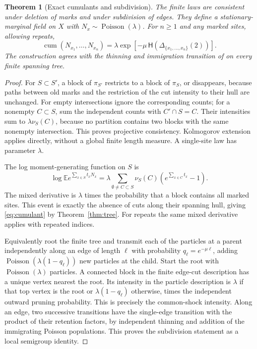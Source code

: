 \documentclass[11pt]{article}
\newtheorem{theorem}{Theorem}[section]
\theoremstyle{remark}
\newcommand{\E}{\mathbb E}
\newcommand{\cum}{\operatorname{cum}}
\newcommand{\D}{\Delta}
\newcommand{\hprice}{\mathsf H}
\begin{document}
\begin{theorem}[Exact cumulants and subdivision]\label{thm:poisson}
The finite laws are consistent under deletion of marks and under subdivision of edges. They define a stationary-marginal field on \(X\) with \(N_x\sim\operatorname{Poisson}(\lambda)\). For \(n\ge1\) and any marked sites, allowing repeats,
\begin{equation}\label{eq:cumulant}
 \cum(N_{x_1},\ldots,N_{x_n})
  =\lambda \exp\!\left[-\mu\,\hprice\!\left(\D_{\{x_1,\ldots,x_n\}}(2)\right)\right].
\end{equation}
The construction agrees with the thinning and immigration transition of \cite{Cote} on every finite spanning tree.
\end{theorem}
\begin{proof}
For \(S\subset S'\), a block of \(\pi_{S'}\) restricts to a block of \(\pi_S\), or disappears, because paths between old marks and the restriction of the cut intensity to their hull are unchanged. For empty intersections ignore the corresponding counts; for a nonempty \(C\subset S\), sum the independent counts with \(C'\cap S=C\). Their intensities sum to \(\lambda\nu_S(C)\), because no partition contains two blocks with the same nonempty intersection. This proves projective consistency. Kolmogorov extension applies directly, without a global finite length measure. A single-site law has parameter \(\lambda\).

The log moment-generating function on \(S\) is
\[
 \log\E e^{\sum_{x\in S}t_xN_x}
   =\lambda \sum_{\emptyset\ne C\subset S}\nu_S(C)
        \left(e^{\sum_{x\in C}t_x}-1\right).
\]
The mixed derivative is \(\lambda\) times the probability that a block contains all marked sites. This event is exactly the absence of cuts along their spanning hull, giving \eqref{eq:cumulant} by Theorem~\ref{thm:tree}. For repeats the same mixed derivative applies with repeated indices.

Equivalently root the finite tree and transmit each of the particles at a parent independently along an edge of length \(\ell\) with probability \(q_\ell=e^{-\mu\ell}\), adding \(\operatorname{Poisson}(\lambda(1-q_\ell))\) new particles at the child. Start the root with \(\operatorname{Poisson}(\lambda)\) particles. A connected block in the finite edge-cut description has a unique vertex nearest the root. Its intensity in the particle description is \(\lambda\) if that top vertex is the root or \(\lambda(1-q_\ell)\) otherwise, times the independent outward pruning probability. This is precisely the common-shock intensity. Along an edge, two successive transitions have the single-edge transition with the product of their retention factors, by independent thinning and addition of the immigrating Poisson populations. This proves the subdivision statement as a local semigroup identity.
\end{proof}
\end{document}
